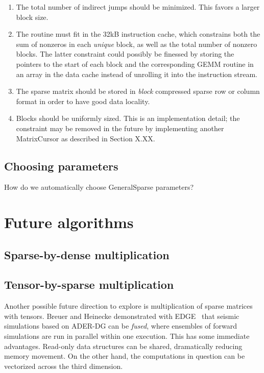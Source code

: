 {\begin{enumerate}

  \item The total number of indirect jumps should be minimized. This favors a larger block size.

  \item The routine must fit in the 32kB instruction cache, which constrains both the sum of nonzeros in each \emph{unique} block, as well as the total number of nonzero blocks. The latter constraint could possibly be finessed by storing the pointers to the start of each block and the corresponding GEMM routine in an array in the data cache instead of unrolling it into the instruction stream.

  \item The sparse matrix should be stored in \emph{block} compressed sparse row or column format in order to have good data locality.

  \item Blocks should be uniformly sized. This is an implementation detail; the constraint may be removed in the future by implementing another MatrixCursor as described in Section X.XX.

\end{enumerate}

\subsection{Choosing parameters}

How do we automatically choose GeneralSparse parameters?

\section{Future algorithms}

\subsection{Sparse-by-dense multiplication}



\subsection{Tensor-by-sparse multiplication}

Another possible future direction to explore is multiplication of sparse matrices with tensors. Breuer and Heinecke demonstrated with EDGE~\cite{10.1007/978-3-319-58667-0_3} that seismic simulations based on ADER-DG can be \emph{fused}, where ensembles of forward simulations are run in parallel within one execution. This has some immediate advantages. Read-only data structures can be shared, dramatically reducing memory movement. On the other hand, the computations in question can be vectorized across the third dimension.

}
